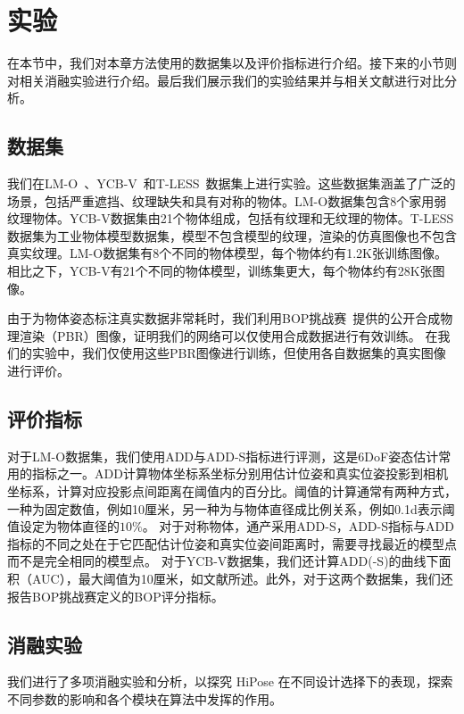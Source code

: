 \section{实验}\label{sec:exp}

在本节中，我们对本章方法使用的数据集以及评价指标进行介绍。接下来的小节则对相关消融实验进行介绍。最后我们展示我们的实验结果并与相关文献进行对比分析。

\subsection{数据集}
我们在LM-O~\cite{Brachmann2016UncertaintyDriven6P}、YCB-V~\cite{xiang2018posecnn}和T-LESS~\cite{hodan2017t}数据集上进行实验。这些数据集涵盖了广泛的场景，包括严重遮挡、纹理缺失和具有对称的物体。LM-O数据集包含8个家用弱纹理物体。YCB-V数据集由21个物体组成，包括有纹理和无纹理的物体。T-LESS数据集为工业物体模型数据集，模型不包含模型的纹理，渲染的仿真图像也不包含真实纹理。LM-O数据集有8个不同的物体模型，每个物体约有1.2K张训练图像。相比之下，YCB-V有21个不同的物体模型，训练集更大，每个物体约有28K张图像。

由于为物体姿态标注真实数据非常耗时，我们利用BOP挑战赛~\cite{Sundermeyer2023BOPC2}提供的公开合成物理渲染（PBR）图像，证明我们的网络可以仅使用合成数据进行有效训练。
在我们的实验中，我们仅使用这些PBR图像进行训练，但使用各自数据集的真实图像进行评价。

\subsection{评价指标}

对于LM-O数据集，我们使用ADD与ADD-S指标进行评测，这是6DoF姿态估计常用的指标之一。ADD计算物体坐标系坐标分别用估计位姿和真实位姿投影到相机坐标系，计算对应投影点间距离在阈值内的百分比。阈值的计算通常有两种方式，一种为固定数值，例如10厘米，另一种为与物体直径成比例关系，例如0.1d表示阈值设定为物体直径的$10\%$。
对于对称物体，通产采用ADD-S，ADD-S指标与ADD指标的不同之处在于它匹配估计位姿和真实位姿间距离时，需要寻找最近的模型点而不是完全相同的模型点。
对于YCB-V数据集，我们还计算ADD(-S)的曲线下面积（AUC），最大阈值为10厘米，如文献\cite{xiang2018posecnn}所述。此外，对于这两个数据集，我们还报告BOP挑战赛定义的BOP评分指标\cite{Sundermeyer2023BOPC2}。

\subsection{消融实验}

我们进行了多项消融实验和分析，以探究 HiPose 在不同设计选择下的表现，探索不同参数的影响和各个模块在算法中发挥的作用。

